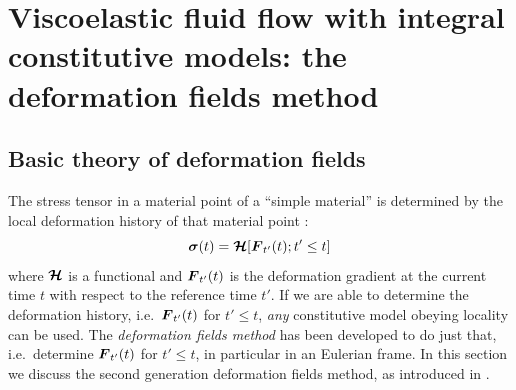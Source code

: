 
\def\headdate{15th May 2017}

\section{Viscoelastic fluid flow with integral constitutive models: the deformation fields method}
\label{sec:dfm}

\subsection{Basic theory of deformation fields}

The stress tensor in a material point of a ``simple material''
is determined by the local deformation history of that material point
\cite{TruesdellC.1966}:
\begin{equation}
   \boldsymbol{\sigma}(t) = \boldsymbol{\mathcal{H}}[\boldsymbol{F}_{t'}(t); t'\leq t]
\end{equation}
where $\boldsymbol{\mathcal{H}}$ is a functional and $\boldsymbol{F}_{t'}(t)$ is the deformation gradient at the current time $t$
with respect to the reference time $t'$. If we are able to determine the deformation history, i.e.\ $\boldsymbol{F}_{t'}(t)$ for $t'\leq t$, \emph{any} constitutive model obeying locality can be used. The \emph{deformation fields method} has been developed to do just that, i.e.\ determine $\boldsymbol{F}_{t'}(t)$ for $t'\leq t$, in particular in an Eulerian frame. In this section we discuss the second generation deformation fields method, as introduced in \cite{Hulsen01}.

